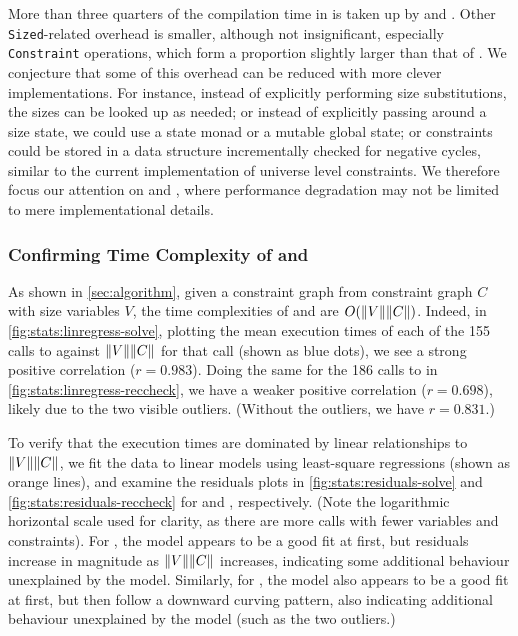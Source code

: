 More than three quarters of the compilation time in \msetlistsized is taken up by \solve and \RecCheck.
Other \texttt{Sized}-related overhead is smaller, although not insignificant,
especially \texttt{Constraint} operations, which form a proportion slightly larger than that of \RecCheck.
We conjecture that some of this overhead can be reduced with more clever implementations.
For instance, instead of explicitly performing size substitutions, the sizes can be looked up as needed;
or instead of explicitly passing around a size state, we could use a state monad or a mutable global state;
or constraints could be stored in a data structure incrementally checked for negative cycles,
similar to the current implementation of universe level constraints.
We therefore focus our attention on \solve and \RecCheck, where performance degradation may not be limited to mere implementational details.



\subsubsection{Confirming Time Complexity of \titlesolve and \titleRecCheck}

As shown in \autoref{sec:algorithm}, given a constraint graph from constraint graph $C$ with size variables $V$,
the time complexities of \solve and \RecCheck are $O(\lVert V\rVert\lVert C\rVert)$.
Indeed, in \autoref{fig:stats:linregress-solve},
plotting the mean execution times of each of the 155 calls to \solve against $\lVert V\rVert\lVert C\rVert$ for that call (shown as blue dots),
we see a strong positive correlation ($r = 0.983$).
Doing the same for the 186 calls to \RecCheck in \autoref{fig:stats:linregress-reccheck},
we have a weaker positive correlation ($r = 0.698$),
likely due to the two visible outliers.
(Without the outliers, we have $r = 0.831$.)

To verify that the execution times are dominated by linear relationships to $\lVert V\rVert\lVert C\rVert$,
we fit the data to linear models using least-square regressions (shown as orange lines),
and examine the residuals plots in \autoref{fig:stats:residuals-solve} and \autoref{fig:stats:residuals-reccheck}
for \solve and \RecCheck, respectively.
(Note the logarithmic horizontal scale used for clarity, as there are more calls with fewer variables and constraints).
For \solve, the model appears to be a good fit at first,
but residuals increase in magnitude as $\lVert V\rVert\lVert C\rVert$ increases,
indicating some additional behaviour unexplained by the model.
Similarly, for \RecCheck, the model also appears to be a good fit at first,
but then follow a downward curving pattern,
also indicating additional behaviour unexplained by the model (such as the two outliers.)

